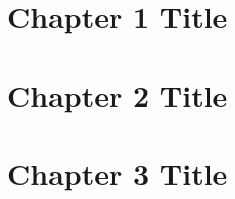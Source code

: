 \documentclass[letterpaper,12pt]{report}
\begin{document}
\begin{linenumbers}

\tableofcontents
\listoffigures

\chapter{Chapter 1 Title}


\chapter{Chapter 2 Title}


\chapter{Chapter 3 Title}

\printbibliography[heading=subbibintoc]



% 





\end{linenumbers}
\end{document}

